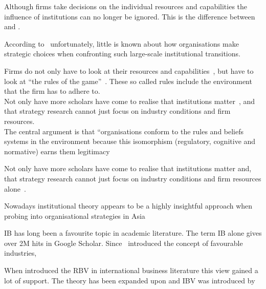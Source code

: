 Although firms take decisions on the individual resources and capabilities \cite{Barney:1991} the influence of institutions can no longer be ignored. This is the difference between \rbv and \ibv. 

According to~\cite{Peng:2003} unfortunately, little is known about how organisations make strategic choices when confronting such large-scale institutional transitions.



 Firms do not only have to look at their resources and capabilities~\cite{Barney:1991}, but have to look at ``the rules of the game''~\cite{Scott:2001}. These so called rules include the environment that the firm \mne has to adhere to.\\


Not only have   more scholars have come to realise that institutions matter~\cite{Powell:1991,Scott:2001}, and that strategy research cannot just focus on industry conditions and firm resources.\\

The central argument is that “organisations conform to the rules and beliefs systems in the environment because this isomorphism (regulatory, cognitive and normative) earns them legitimacy


Not only have more scholars have come to realise that institutions matter and, that strategy research cannot just focus on industry conditions and firm resources alone~\cite{Powell:1991,Scott:2001}.

Nowadays institutional theory appears to be a highly insightful approach when probing into organisational strategies in Asia~\cite{Hoskisson:2000}



\Gls{IB} has long been a favourite topic in academic literature. The term \gls{IB} alone gives over 2M hits in Google Scholar. Since~\cite{Porter:1980} introduced the concept of favourable industries, 

When introduced the \gls{RBV} in international business literature this view gained a lot of support. 
The theory has been expanded upon and \gls{IBV} was introduced by~\cite{Kostova:1999,Meyer:2009,Wang:2012}
